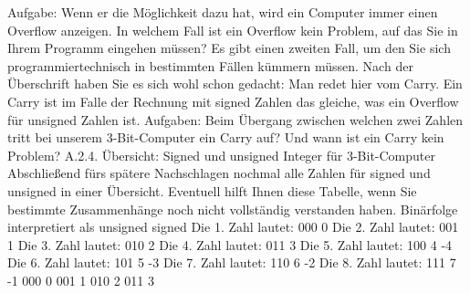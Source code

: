 Aufgabe:
Wenn er die Möglichkeit dazu hat, wird ein Computer immer einen Overflow anzeigen. In welchem Fall ist ein Overflow kein Problem, auf das Sie in Ihrem Programm eingehen müssen?
Es gibt einen zweiten Fall, um den Sie sich programmiertechnisch in bestimmten Fällen kümmern müssen. Nach der Überschrift haben Sie es sich wohl schon gedacht: Man redet hier vom Carry. Ein Carry ist im Falle der Rechnung mit signed Zahlen das gleiche, was ein Overflow für unsigned Zahlen ist.
Aufgaben:
Beim Übergang zwischen welchen zwei Zahlen tritt bei unserem 3-Bit-Computer ein Carry auf?
Und wann ist ein Carry kein Problem?
A.2.4. Übersicht: Signed und unsigned Integer für 3-Bit-Computer
Abschließend fürs spätere Nachschlagen nochmal alle Zahlen für signed und unsigned in einer Übersicht. Eventuell hilft Ihnen diese Tabelle, wenn Sie bestimmte Zusammenhänge noch nicht vollständig verstanden haben.
Binärfolge	interpretiert als
unsigned	signed
Die 1. Zahl lautet:	000		0
Die 2. Zahl lautet:	001		1
Die 3. Zahl lautet:	010		2
Die 4. Zahl lautet:	011		3
Die 5. Zahl lautet:	100 		4		-4
Die 6. Zahl lautet:	101 		5		-3
Die 7. Zahl lautet:	110 		6		-2
Die 8. Zahl lautet:	111 		7		-1
000				  0
001				  1
010				  2
011				  3


